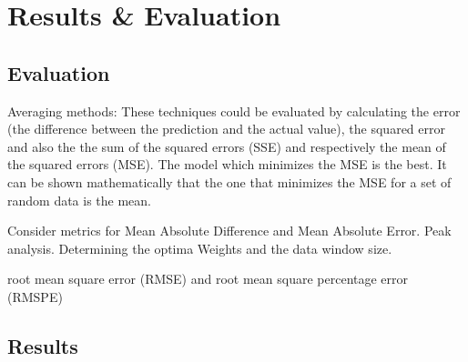 \chapter{Results \& Evaluation}

\section{Evaluation}
Averaging methods: These techniques could be evaluated by calculating the error (the difference between the prediction and the actual value), the squared error and also the the sum of the squared errors (SSE) and respectively the mean of the squared errors (MSE).
The model which minimizes the MSE is the best. It can be shown mathematically that the one that minimizes the MSE for a set of random data is the mean.

Consider metrics for Mean Absolute Difference and Mean Absolute Error. Peak analysis.
Determining the optima Weights and the data window size.

root mean square error (RMSE) and root mean square percentage error (RMSPE)
\section{Results}